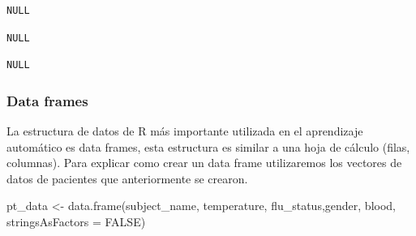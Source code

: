 \documentclass[
  letterpaper,
  DIV=11,
  numbers=noendperiod]{scrartcl}
\newenvironment{Shaded}{\begin{snugshade}}{\end{snugshade}}
\newcommand{\AttributeTok}[1]{\textcolor[rgb]{0.40,0.45,0.13}{#1}}
\newcommand{\ConstantTok}[1]{\textcolor[rgb]{0.56,0.35,0.01}{#1}}
\newcommand{\FunctionTok}[1]{\textcolor[rgb]{0.28,0.35,0.67}{#1}}
\newcommand{\NormalTok}[1]{\textcolor[rgb]{0.00,0.23,0.31}{#1}}
\newcommand{\OtherTok}[1]{\textcolor[rgb]{0.00,0.23,0.31}{#1}}
\newcommand{\SpecialCharTok}[1]{\textcolor[rgb]{0.37,0.37,0.37}{#1}}
\newcommand{\StringTok}[1]{\textcolor[rgb]{0.13,0.47,0.30}{#1}}
\begin{document}
\begin{Shaded}
\end{Shaded}

\begin{verbatim}
NULL
\end{verbatim}

\begin{Shaded}
\end{Shaded}

\begin{verbatim}
NULL
\end{verbatim}

\begin{Shaded}
\end{Shaded}

\begin{verbatim}
NULL
\end{verbatim}

\hypertarget{data-frames}{%
\subsubsection{Data frames}\label{data-frames}}

La estructura de datos de R más importante utilizada en el aprendizaje
automático es data frames, esta estructura es similar a una hoja de
cálculo (filas, columnas). Para explicar como crear un data frame
utilizaremos los vectores de datos de pacientes que anteriormente se
crearon.

\begin{Shaded}
\begin{Highlighting}[]
\NormalTok{pt\_data }\OtherTok{\textless{}{-}} \FunctionTok{data.frame}\NormalTok{(subject\_name, temperature, flu\_status,gender, blood, }\AttributeTok{stringsAsFactors =} \ConstantTok{FALSE}\NormalTok{)}
\end{Highlighting}
\end{Shaded}
\end{document}
